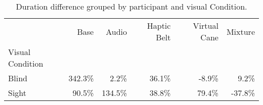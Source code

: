 
\begin{table}[!htb]
\centering
\caption{Duration difference grouped by participant and visual Condition.}
\label{tab:duracao_var_group}
\begin{tabular}{lrrrrr}
\toprule
{} &    Base &   Audio & Haptic Belt & Virtual Cane & Mixture \\
Visual Condition &         &         &             &              &         \\
\midrule
Blind            &  342.3\% &    2.2\% &       36.1\% &        -8.9\% &    9.2\% \\
Sight            &   90.5\% &  134.5\% &       38.8\% &        79.4\% &  -37.8\% \\
\bottomrule
\end{tabular}
\end{table}

